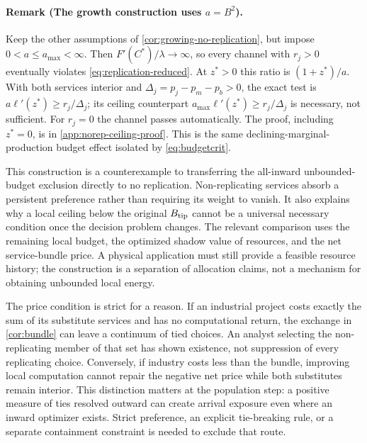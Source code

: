 \paragraph{Remark (The growth construction uses $a=B^2$).}
Keep the other assumptions of \cref{cor:growing-no-replication}, but
impose $0<a\leq a_{\max}<\infty$. Then $F'(C^*)/\lambda\to\infty$,
so every channel with $r_j>0$ eventually violates
\cref{eq:replication-reduced}. At $z^*>0$ this ratio is $(1+z^*)/a$.
With both services interior and $\Delta_j=p_j-p_m-p_b>0$, the exact test is
$a\ell'(z^*)\geq r_j/\Delta_j$; its ceiling counterpart
$a_{\max}\ell'(z^*)\geq r_j/\Delta_j$ is necessary, not sufficient.
For $r_j=0$ the channel passes automatically. The proof, including $z^*=0$,
is in \cref{app:norep-ceiling-proof}. This is the same declining-marginal-production
budget effect isolated by \cref{eq:budgetcrit}.

This construction is a counterexample to transferring the all-inward
unbounded-budget exclusion directly to no replication. Non-replicating
services absorb a persistent preference rather than requiring its weight
to vanish. It also explains why a local ceiling below the original
$B_{\rm tip}$ cannot be a universal necessary condition once the decision
problem changes. The relevant comparison uses the remaining local budget,
the optimized shadow value of resources, and the net service-bundle price.
A physical application must still provide a feasible resource history;
the construction is a separation of allocation claims, not a mechanism
for obtaining unbounded local energy.

The price condition is strict for a reason. If an industrial project
costs exactly the sum of its substitute services and has no computational
return, the exchange in \cref{cor:bundle} can leave a continuum of tied
choices. An analyst selecting the non-replicating member of that set has
shown existence, not suppression of every replicating choice. Conversely,
if industry costs less than the bundle, improving local computation cannot
repair the negative net price while both substitutes remain interior.
This distinction matters at the population step: a positive measure of
ties resolved outward can create arrival exposure even where an inward
optimizer exists. Strict preference, an explicit tie-breaking rule, or a
separate containment constraint is needed to exclude that route.

